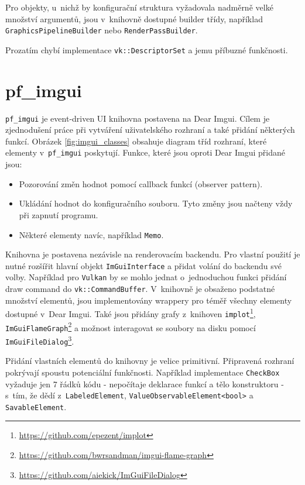 Pro objekty, u~nichž by konfigurační struktura vyžadovala nadměrně velké množství argumentů, jsou v~knihovně dostupné builder třídy, například \texttt{GraphicsPipelineBuilder} nebo \texttt{RenderPassBuilder}.

Prozatím chybí implementace \texttt{vk::DescriptorSet} a jemu příbuzné funkčnosti.


\section{pf\_imgui}
\texttt{pf\_imgui} je event-driven UI knihovna postavena na Dear Imgui. Cílem je zjednodušení práce při vytváření uživatelského rozhraní a také přidání některých funkcí. Obrázek \ref{fig:imgui_classes} obsahuje diagram tříd rozhraní, které elementy v~\texttt{pf\_imgui} poskytují. Funkce, které jsou oproti Dear Imgui přidané jsou:

\begin{itemize}
	\item Pozorování změn hodnot pomocí callback funkcí (observer pattern).
	\item Ukládání hodnot do konfiguračního souboru. Tyto změny jsou načteny vždy při zapnutí programu.
	\item Některé elementy navíc, například \texttt{Memo}.
\end{itemize}

Knihovna je postavena nezávisle na renderovacím backendu. Pro vlastní použití je nutné rozšířit hlavní objekt \texttt{ImGuiInterface} a přidat volání do backendu své volby. Například pro \texttt{Vulkan} by se mohlo jednat o~jednoduchou funkci přidání draw command do \texttt{vk::CommandBuffer}. V~knihovně je obsaženo podstatné množství elementů, jsou implementovány wrappery pro téměř všechny elementy dostupné v~Dear Imgui. Také jsou přidány grafy z~knihoven \texttt{implot}\footnote{\url{https://github.com/epezent/implot}}, \texttt{ImGuiFlameGraph}\footnote{\url{https://github.com/bwrsandman/imgui-flame-graph}} a možnost interagovat se soubory na disku pomocí \texttt{ImGuiFileDialog}\footnote{\url{https://github.com/aiekick/ImGuiFileDialog}}.

Přidání vlastních elementů do knihovny je velice primitivní. Připravená rozhraní pokrývají spoustu potenciální funkčnosti. Například implementace \texttt{CheckBox} vyžaduje jen 7 řádků kódu - nepočítaje deklarace funkcí a tělo konstruktoru - s~tím, že dědí z~\texttt{LabeledElement}, \texttt{ValueObservableElement<bool>} a \texttt{SavableElement}.

